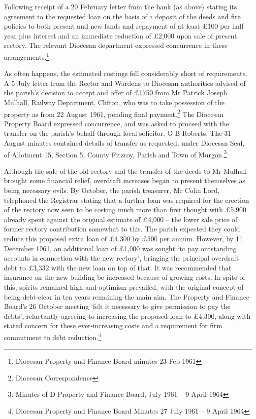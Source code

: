 Following receipt of a 20 February letter from the bank (as above)
stating its agreement to the requested loan on the basis of a deposit of
the deeds and fire policies to both present and new lands and repayment
of at least \pounds100 per half year plus interest and an immediate reduction
of \pounds2,000 upon sale of present rectory. The relevant Diocesan department
expressed concurrence in these arrangements.\footnote{Diocesan Property
  and Finance Board minutes 23 Feb 1961}

As often happens, the estimated costings fell considerably short of
requirements. A 5 July letter from the Rector and Wardens to Diocesan
authorities advised of the parish's decision to accept and offer of
\pounds1750 from Mr Patrick Joseph Mulhall, Railway Department, Clifton, who
was to take possession of the property as from 22 August 1961, pending
final payment.\footnote{Diocesan Correspondence} The Diocesan Property
Board expressed concurrence, and was asked to proceed with the transfer
on the parish's behalf through local solicitor, G B Roberts. The 31
August minutes contained details of transfer as requested, under
Diocesan Seal, of Allotment 15, Section 5, County Fitzroy, Parish and
Town of Murgon.\footnote{Minutes of D Property and Finance Board, July
  1961 -- 9 April 1964}

Although the sale of the old rectory and the transfer of the deeds to Mr
Mulhall brought some financial relief, overdraft increases began to
present themselves as being necessary evils. By October, the parish
treasurer, Mr Colin Lord, telephoned the Registrar stating that a
further loan was required for the erection of the rectory now seen to be
costing much more than first thought with \pounds5,900 already spent against
the original estimate of \pounds4,000 -- the lower sale price of former
rectory contribution somewhat to this. The parish expected they could
reduce this proposed extra loan of \pounds4,300 by \pounds500 per annum. However, by
11 December 1961, an additional loan of \pounds1,000 was sought `to pay
outstanding accounts in connection with the new rectory', bringing the
principal overdraft debt to \pounds3,332 with the new loan on top of that. It
was recommended that insurance on the new building be increased because
of growing costs. In spite of this, spirits remained high and optimism
prevailed, with the original concept of being debt-clear in ten years
remaining the main aim. The Property and Finance Board's 26 October
meeting `felt it necessary to give permission to pay the debts',
reluctantly agreeing to increasing the proposed loan to \pounds4,300, along
with stated concern for these ever-increasing costs and a requirement
for firm commitment to debt reduction.\footnote{Diocesan Property and
  Finance Board Minutes 27 July 1961 -- 9 April 1964}

